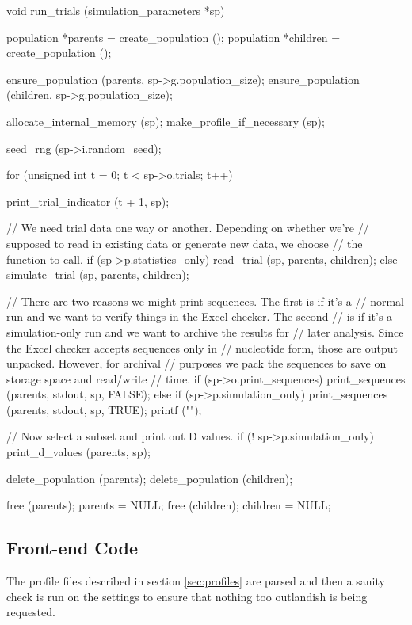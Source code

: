 \documentclass{article}
\begin{document}
\begin{ccode}
void run_trials (simulation_parameters *sp) {
  population *parents = create_population ();
  population *children = create_population ();

  ensure_population (parents, sp->g.population_size);
  ensure_population (children, sp->g.population_size);

  allocate_internal_memory (sp);
  make_profile_if_necessary (sp);

  seed_rng (sp->i.random_seed);

  for (unsigned int t = 0; t < sp->o.trials; t++) {
    print_trial_indicator (t + 1, sp);

    // We need trial data one way or another. Depending on whether we're
    // supposed to read in existing data or generate new data, we choose
    // the function to call.
    if (sp->p.statistics_only)
      read_trial (sp, parents, children);
    else
      simulate_trial (sp, parents, children);
    
    // There are two reasons we might print sequences. The first is if it's a
    // normal run and we want to verify things in the Excel checker. The second
    // is if it's a simulation-only run and we want to archive the results for
    // later analysis. Since the Excel checker accepts sequences only in
    // nucleotide form, those are output unpacked. However, for archival
    // purposes we pack the sequences to save on storage space and read/write
    // time.
    if (sp->o.print_sequences)
      print_sequences (parents, stdout, sp, FALSE);
    else if (sp->p.simulation_only) {
      print_sequences (parents, stdout, sp, TRUE);
      printf ("\n");
    }

    // Now select a subset and print out D values.
    if (! sp->p.simulation_only)
      print_d_values (parents, sp);
  }

  delete_population (parents);
  delete_population (children);

  free (parents); parents = NULL;
  free (children); children = NULL;
}
\end{ccode}

    \subsection{Front-end Code}

      The profile files described in section \ref{sec:profiles} are parsed and
      then a sanity check is run on the settings to ensure that nothing too
      outlandish is being requested.
\end{document}
